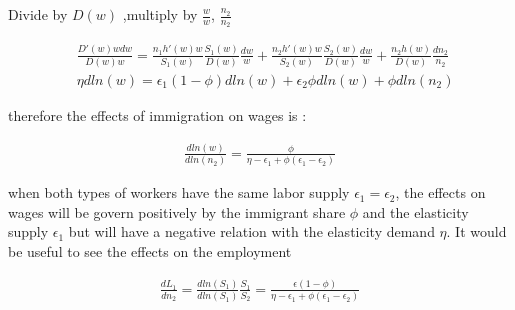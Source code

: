 \begin{enumerate}[label=(\alph*)]
Divide by $D(w)$ ,multiply by $\frac{w}{w}$, $\frac{n_2}{n_2}$

\begin{equation}
\begin{aligned}
 & \frac{D'(w)wdw}{D(w)w}  =  \frac{n_1h'(w)w}{S_1(w)}\frac{S_1(w)}{D(w)}\frac{dw}{w} +
 \frac{n_2h'(w)w}{S_2(w)}\frac{S_2(w)}{D(w)}\frac{dw}{w} +
 \frac{n_2h(w)}{D(w)}\frac{dn_2}{n_2} \\
 & \eta dln(w) = \epsilon_1(1-\phi)dln(w) + \epsilon_2\phi dln(w) + \phi dln(n_2)
\end{aligned}
\end{equation}


therefore the effects of immigration on wages is :

\begin{equation}
\begin{aligned}
\frac{dln(w)}{dln(n_2)} = \frac{\phi}{\eta - \epsilon_1 + \phi(\epsilon_1 - \epsilon_2)}
\end{aligned}
\end{equation}

when both types of workers have the same labor supply $\epsilon_1 = \epsilon_2$, the effects on wages will be govern positively by the immigrant share $\phi$ and the elasticity supply $\epsilon_1$ but will have a negative relation with the elasticity demand $\eta$.
It would be useful to see the effects on the employment 

\begin{equation}
\begin{aligned}
\frac{dL_1}{dn_2} = \frac{dln(S_1)}{dln(S_1)}\frac{S_1}{S_2} =   \frac{\epsilon(1-\phi) }{\eta - \epsilon_1 + \phi(\epsilon_1 - \epsilon_2)}
\end{aligned}
\end{equation}


\end{enumerate}
